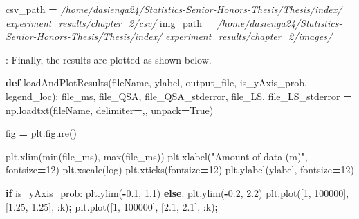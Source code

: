 \documentclass[12pt, twoside]{amherstthesis}
\newenvironment{Shaded}{\begin{snugshade}}{\end{snugshade}}
\newcommand{\BuiltInTok}[1]{#1}
\newcommand{\CommentTok}[1]{\textcolor[rgb]{0.56,0.35,0.01}{\textit{#1}}}
\newcommand{\ControlFlowTok}[1]{\textcolor[rgb]{0.13,0.29,0.53}{\textbf{#1}}}
\newcommand{\DecValTok}[1]{\textcolor[rgb]{0.00,0.00,0.81}{#1}}
\newcommand{\FloatTok}[1]{\textcolor[rgb]{0.00,0.00,0.81}{#1}}
\newcommand{\KeywordTok}[1]{\textcolor[rgb]{0.13,0.29,0.53}{\textbf{#1}}}
\newcommand{\NormalTok}[1]{#1}
\newcommand{\OperatorTok}[1]{\textcolor[rgb]{0.81,0.36,0.00}{\textbf{#1}}}
\newcommand{\StringTok}[1]{\textcolor[rgb]{0.31,0.60,0.02}{#1}}
\newcommand{\VariableTok}[1]{\textcolor[rgb]{0.00,0.00,0.00}{#1}}
\begin{document}
\begin{Shaded}
\begin{Highlighting}[]
\NormalTok{csv\_path }\OperatorTok{=} 
\CommentTok{\textquotesingle{}/home/dasienga24/Statistics{-}Senior{-}Honors{-}Thesis/Thesis/index/\textquotesingle{}}
\CommentTok{\textquotesingle{}experiment\_results/chapter\_2/csv/\textquotesingle{}}
\NormalTok{img\_path }\OperatorTok{=} 
\CommentTok{\textquotesingle{}/home/dasienga24/Statistics{-}Senior{-}Honors{-}Thesis/Thesis/index/\textquotesingle{}}
\CommentTok{\textquotesingle{}experiment\_results/chapter\_2/images/\textquotesingle{}}
\end{Highlighting}
\end{Shaded}
\noindent: Finally, the results are plotted as shown below.
\begin{Shaded}
\begin{Highlighting}[]
\KeywordTok{def}\NormalTok{ loadAndPlotResults(fileName, ylabel, output\_file, is\_yAxis\_prob, legend\_loc):}
\NormalTok{    file\_ms, file\_QSA, file\_QSA\_stderror, file\_LS, }
\NormalTok{    file\_LS\_stderror }\OperatorTok{=}\NormalTok{ np.loadtxt(fileName, delimiter}\OperatorTok{=}\StringTok{\textquotesingle{},\textquotesingle{}}\NormalTok{, unpack}\OperatorTok{=}\VariableTok{True}\NormalTok{)}

\NormalTok{    fig }\OperatorTok{=}\NormalTok{ plt.figure()}

\NormalTok{    plt.xlim(}\BuiltInTok{min}\NormalTok{(file\_ms), }\BuiltInTok{max}\NormalTok{(file\_ms))}
\NormalTok{    plt.xlabel(}\StringTok{"Amount of data (m)"}\NormalTok{, fontsize}\OperatorTok{=}\DecValTok{12}\NormalTok{)}
\NormalTok{    plt.xscale(}\StringTok{\textquotesingle{}log\textquotesingle{}}\NormalTok{)}
\NormalTok{    plt.xticks(fontsize}\OperatorTok{=}\DecValTok{12}\NormalTok{)}
\NormalTok{    plt.ylabel(ylabel, fontsize}\OperatorTok{=}\DecValTok{12}\NormalTok{)}

    \ControlFlowTok{if}\NormalTok{ is\_yAxis\_prob:}
\NormalTok{        plt.ylim(}\OperatorTok{{-}}\FloatTok{0.1}\NormalTok{, }\FloatTok{1.1}\NormalTok{)}
    \ControlFlowTok{else}\NormalTok{:}
\NormalTok{        plt.ylim(}\OperatorTok{{-}}\FloatTok{0.2}\NormalTok{, }\FloatTok{2.2}\NormalTok{)}
\NormalTok{        plt.plot([}\DecValTok{1}\NormalTok{, }\DecValTok{100000}\NormalTok{], [}\FloatTok{1.25}\NormalTok{, }\FloatTok{1.25}\NormalTok{], }\StringTok{\textquotesingle{}:k\textquotesingle{}}\NormalTok{)}\OperatorTok{;}
\NormalTok{        plt.plot([}\DecValTok{1}\NormalTok{, }\DecValTok{100000}\NormalTok{], [}\FloatTok{2.1}\NormalTok{,  }\FloatTok{2.1}\NormalTok{],  }\StringTok{\textquotesingle{}:k\textquotesingle{}}\NormalTok{)}\OperatorTok{;}      


\end{Highlighting}
\end{Shaded}
\end{document}
